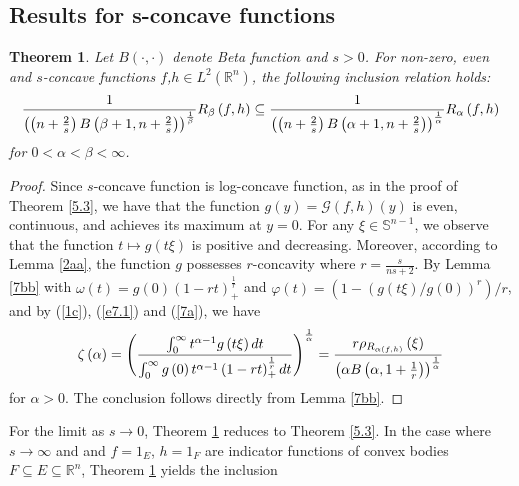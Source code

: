 \documentclass[preprint,12pt]{elsarticle}
\newtheorem{thm}{Theorem}
\begin{document}
\subsection{Results for s-concave functions}\label{s7.3}
\begin{thm}\label{7cc} 
Let $B(\cdot, \cdot)$ denote Beta function and $s> 0$. For non-zero, even and $s$-concave functions $f$,$h\in L^{2}\left ( \mathbb{R}^n  \right )$, the following inclusion relation holds:
\begin{eqnarray}
	\frac{1}{\left ( \left ( n+\frac{2}{s}   \right )B\left ( \beta +1 ,n+\frac{2}{s} \right )  \right )^{\frac{1}{\beta } }  }R_{\beta  }\left ( f,h \right )\subseteq \frac{1}{\left ( \left ( n+\frac{2}{s}   \right )B\left ( \alpha +1 ,n+\frac{2}{s} \right )  \right )^{\frac{1}{\alpha  } }  }R_{\alpha }\left ( f,h \right ) \notag
\end{eqnarray}
for $0< \alpha < \beta < \infty $.
\end{thm}
\begin{proof}
Since $s$-concave function is log-concave function, as in the proof of Theorem \ref{5.3}, we have that the function $ g\left ( y \right ) =\mathscr{G}\left ( f,h \right )\left ( y \right ) $ is even, continuous, and achieves its maximum at $y=0$. For any $\xi \in \mathbb{S}^{n-1}$, we observe that the function $t\longmapsto g\left ( t\xi  \right )$ is positive and decreasing. Moreover, according to Lemma \ref{2aa}, the function $g$ possesses $r$-concavity where $r=\frac{s}{ns+2}$. By Lemma \ref{7bb} with $\omega \left ( t \right )=g\left ( 0 \right )\left ( 1-rt \right )^{\frac{1}{r} } _{+} $ and $\varphi \left ( t \right )=\left ( 1-\left ( g\left ( t\xi  \right )/g\left ( 0 \right )   \right )^{r}   \right )/r$, and by (\ref{1c}), (\ref{e7.1}) and (\ref{7a}), we have 
\begin{eqnarray}
	\zeta\left ( \alpha  \right )=\left ( \frac{\int_{0}^{\infty }t^{\alpha -1}g\left ( t\xi  \right )dt   }{\int_{0}^{\infty }g\left ( 0 \right ) t^{\alpha -1}\left ( 1-rt \right )^{\frac{1}{r} } _{+}dt    }  \right )^{\frac{1}{\alpha } }=\frac{r\rho _{R_{\alpha \left ( f,h \right ) } }\left ( \xi  \right )} { \left ( \alpha B \left ( \alpha ,1+\frac{1}{r}  \right ) \right )^{\frac{1}{\alpha } }    } \notag
\end{eqnarray}
for $\alpha > 0$. The conclusion follows directly from Lemma \ref{7bb}.
\end{proof}
For the limit as $s\to 0$, Theorem \ref{7cc} reduces to Theorem \ref{5.3}. In the case where $s\to \infty $
and and $f=1_{E}$, $h=1_{F}$ are indicator functions of convex bodies $F\subseteq E\subseteq \mathbb{R}^n$, Theorem \ref{7cc} yields the inclusion
\end{document}
